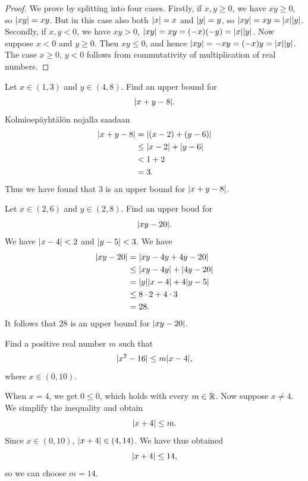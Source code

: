 \documentclass[11pt,a4paper]{amsart}
\begin{document}
\begin{proof}
  We prove by splitting into four cases. Firstly, if \(x,y \geq 0\), we have
  \(xy \geq 0\), so \(\lvert xy\rvert = xy\). But in this case also both
  \(\lvert x\rvert = x\) and \(\lvert y\rvert = y\), so \(\lvert xy\rvert = xy = \lvert x\rvert\lvert y\rvert\).
  Secondly, if \(x, y < 0\), we have \(xy > 0\),
  \(\lvert xy\rvert = xy = (-x)(-y) = \lvert x\rvert\lvert y\rvert\). Now suppose
  \(x < 0\) and \(y \geq 0\). Then \(xy\leq 0\), and hence
  \(\lvert xy\rvert=-xy=(-x)y=\lvert x\rvert\lvert y\rvert\). The
  case \(x \geq 0\), \(y < 0\) follows from commutativity of multiplication
  of real numbers.
\end{proof}

\begin{example}
  Let \(x \in (1, 3)\) and \(y \in (4, 8)\). Find an upper bound for
  \[\lvert x + y - 8\rvert.\] Kolmioepäyhtälön nojalla saadaan
  \[
    \begin{aligned}
      \lvert x + y - 8\rvert &= \lvert(x - 2) + (y - 6)\rvert \\
      &\leq \lvert x - 2\rvert + \lvert y - 6\rvert \\
      &< 1 + 2 \\
      &= 3.
    \end{aligned}
  \]
  Thus we have found that \(3\) is an upper bound for
  \(\lvert x + y - 8\rvert\).
\end{example}

\begin{example}
  Let \(x \in (2, 6)\) and \(y \in (2, 8)\). Find an upper boud for
  \[\lvert xy - 20\rvert.\]
  We have \(\lvert x - 4\rvert < 2\) and \(\lvert y - 5\rvert < 3\). We have
  \[
    \begin{aligned}
      \lvert xy - 20\rvert &= \lvert xy - 4y + 4y - 20\rvert \\
      &\leq \lvert xy - 4y\rvert + \lvert4y - 20\rvert \\
      &= \lvert y\rvert\lvert x - 4\rvert + 4\lvert y - 5\rvert \\
      &\leq 8 \cdot 2 + 4 \cdot 3 \\
      &= 28.
    \end{aligned}
  \]
  It follows that \(28\) is an upper bound for \(\lvert xy - 20\rvert\).
\end{example}

\begin{example}
  Find a positive real number \(m\) such that
  \[\lvert x^2 - 16\rvert \leq m\lvert x - 4\rvert,\]
  where \(x \in (0, 10)\).

  When \(x = 4\), we get \(0 \leq 0\), which holds with every \(m \in \mathbb{R}\).
  Now suppose \(x \neq 4\). We simplify the inequality and obtain
  \[\lvert x + 4\rvert \leq m.\]
  Since \(x \in (0, 10)\), \(\lvert x + 4\rvert \in (4, 14)\). We have thus obtained
  \[\lvert x + 4\rvert \le 14,\]
  so we can choose \(m = 14\).
\end{example}
\end{document}
